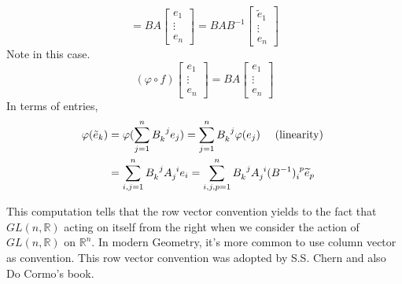 \[
    =B A\left[\begin{array}{c}
    e_1 \\
    \vdots \\
    e_n
    \end{array}\right]=B A B^{-1}\left[\begin{array}{c}
    \tilde{e}_1 \\
    \vdots \\
    e_n
    \end{array}\right]
\]
Note in this case.
\[
(\varphi \circ f)\left[\begin{array}{c}
e_1 \\
\vdots \\
e_n
\end{array}\right]=B A\left[\begin{array}{c}
e_1 \\
\vdots \\
e_n
\end{array}\right]
\]
In terms of entries,
\begin{align*}
    \varphi(\tilde{e}_k) &=\varphi(\sum_{j=1}^n B\indices{_k^j} e_j)=\sum_{j=1}^n B\indices{_k^j} \varphi(e_j) \quad \text { (linearity) } \\
    &=\sum_{i, j=1}^n B\indices{_k^j} A\indices{_j^i} e_i=\sum_{i,j,p=1}^n B\indices{_k^j} A\indices{_j^i}(B^{-1})\indices{_i^p} \widetilde{e}_p
\end{align*}
\begin{remark}
    This computation tells that the row vector convention yields to the fact that $GL(n,\mathbb{R})$ acting on itself from the right when we consider the action of $GL(n, \mathbb{R})$ on $\mathbb{R}^n$.
    In modern Geometry, it's more common to use column vector as convention. This row vector convention was adopted by S.S. Chern and also Do Cormo's book.
\end{remark}
